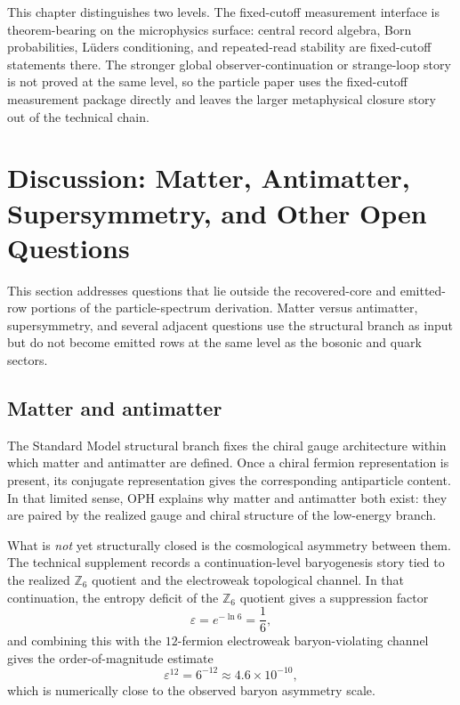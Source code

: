 \documentclass[11pt]{article}
\begin{document}
This chapter distinguishes two levels. The fixed-cutoff measurement interface is theorem-bearing
on the microphysics surface: central record algebra, Born probabilities, L\"uders conditioning,
and repeated-read stability are fixed-cutoff statements there. The stronger global
observer-continuation or strange-loop story is not proved at the same level, so the
particle paper uses the fixed-cutoff measurement package directly and leaves the larger
metaphysical closure story out of the technical chain.

\section{Discussion: Matter, Antimatter, Supersymmetry, and Other Open Questions}

This section addresses questions that lie outside the recovered-core and emitted-row portions of
the particle-spectrum derivation. Matter versus antimatter, supersymmetry, and several adjacent
questions use the structural branch as input but do not become emitted rows at the same level as
the bosonic and quark sectors.

\subsection{Matter and antimatter}

The Standard Model structural branch fixes the chiral gauge architecture within which
matter and antimatter are defined. Once a chiral fermion representation is present, its conjugate
representation gives the corresponding antiparticle content. In that limited sense, OPH explains
why matter and antimatter both exist: they are paired by the realized gauge and chiral structure
of the low-energy branch.

What is \emph{not} yet structurally closed is the cosmological asymmetry between them. The
technical supplement records a continuation-level baryogenesis story tied to the realized
\(\mathbb Z_6\) quotient and the electroweak topological channel. In that continuation, the
entropy deficit of the \(\mathbb Z_6\) quotient gives a suppression factor
\[
\varepsilon = e^{-\ln 6} = \frac{1}{6},
\]
and combining this with the \(12\)-fermion electroweak baryon-violating channel gives the
order-of-magnitude estimate
\[
\varepsilon^{12}=6^{-12}\approx 4.6\times 10^{-10},
\]
which is numerically close to the observed baryon asymmetry scale.
\end{document}
